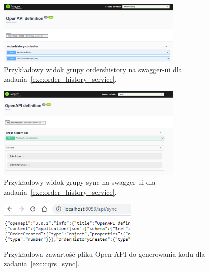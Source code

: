 \documentclass[12pt]{article}
\begin{document}
    \begin{figure}[p]
        \centering
        \includegraphics[width=0.8\textwidth]{lista-3-2-a}
        \caption{Przykładowy widok grupy ordershistory na swagger-ui dla zadania~\ref{exc:order_history_service}.}
        \label{fig:swagger-orders-gr}
    \end{figure}
    \begin{figure}[p]
        \centering
        \includegraphics[width=0.8\textwidth]{lista-3-2-b}
        \caption{Przykładowy widok grupy sync na swagger-ui dla zadania~\ref{exc:order_history_service}.}
        \label{fig:swagger-sync-gr}
    \end{figure}
    \begin{figure}[p]
        \centering
        \includegraphics[width=0.6\textwidth]{lista-3-3-a}
        \caption{Przykładowa zawartość pliku Open API do generowania kodu dla zadania~\ref{exc:cqrs_sync}.}
        \label{fig:openapi-gen}
    \end{figure}
\end{document}

